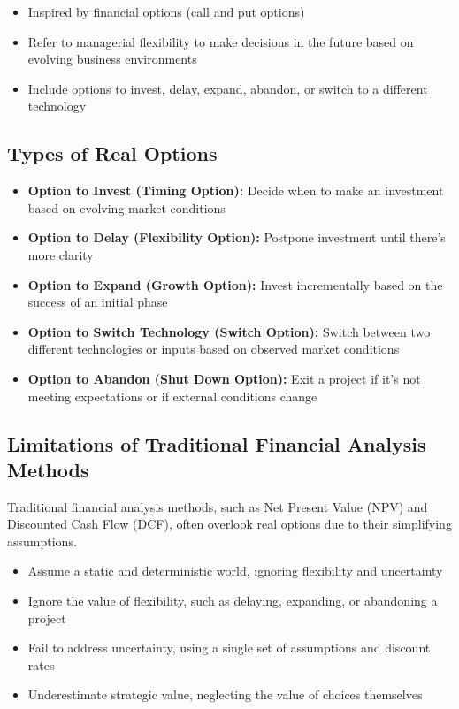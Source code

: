 \begin{itemize}
    \item Inspired by financial options (call and put options)
    \item Refer to managerial flexibility to make decisions in the future based on evolving business environments
    \item Include options to invest, delay, expand, abandon, or switch to a different technology
\end{itemize}

\subsection*{Types of Real Options}

\begin{itemize}
    \item \textbf{Option to Invest (Timing Option):} Decide when to make an investment based on evolving market conditions
    \item \textbf{Option to Delay (Flexibility Option): }Postpone investment until there's more clarity
    \item \textbf{Option to Expand (Growth Option):} Invest incrementally based on the success of an initial phase
    \item \textbf{Option to Switch Technology (Switch Option): }Switch between two different technologies or inputs based on observed market conditions
    \item \textbf{Option to Abandon (Shut Down Option): }Exit a project if it's not meeting expectations or if external conditions change
\end{itemize}

\subsection*{Limitations of Traditional Financial Analysis Methods}

Traditional financial analysis methods, such as Net Present Value (NPV) and Discounted Cash Flow (DCF), often overlook real options due to their simplifying assumptions.

\begin{itemize}
    \item Assume a static and deterministic world, ignoring flexibility and uncertainty
    \item Ignore the value of flexibility, such as delaying, expanding, or abandoning a project
    \item Fail to address uncertainty, using a single set of assumptions and discount rates
    \item Underestimate strategic value, neglecting the value of choices themselves
\end{itemize}

